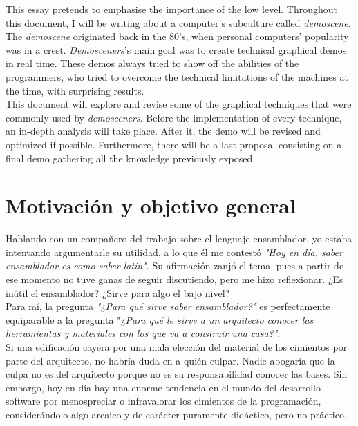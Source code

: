 This essay pretends to emphasise the importance of the low level. Throughout this document, I will be writing about a computer's subculture called \emph{demoscene}.\\

The \emph{demoscene} originated back in the 80's, when personal computers' popularity was in a crest. \emph{Demosceners}'s main goal was to create technical graphical demos in real time. These demos always tried to show off the abilities of the programmers, who tried to overcome the technical limitations of the machines at the time, with surprising results.\\

This document will explore and revise some of the graphical techniques that were commonly used by \emph{demosceners}. Before the implementation of every technique, an in-depth analysis will take place. After it, the demo will be revised and optimized if possible. Furthermore, there will be a last proposal consisting on a final demo gathering all the knowledge previously exposed.

\chapter*{Motivación y objetivo general}

\thispagestyle{empty}
\vspace{1cm}

Hablando con un compañero del trabajo sobre el lenguaje ensamblador,
yo estaba intentando argumentarle su utilidad, a lo que él me contestó 
\emph{"Hoy en día, saber ensamblador es como saber latín"}.
Su afirmación zanjó el tema, pues a partir de ese momento no tuve ganas de
seguir discutiendo, pero me hizo reflexionar. ¿Es inútil el ensamblador?
¿Sirve para algo el bajo nivel?\\

Para mí, la pregunta \emph{"¿Para qué sirve saber ensamblador?"} es perfectamente equiparable a la pregunta "\emph{¿Para qué le sirve a un arquitecto conocer las herramientas y materiales con los que va a construir una casa?"}.\\

Si una edificación cayera por una mala elección del material de los cimientos por parte del arquitecto, no habría duda en a quién culpar. Nadie abogaría que la culpa no es del arquitecto porque no es su responsabilidad conocer las bases.
Sin embargo, hoy en día hay una enorme tendencia en el mundo del desarrollo software por menospreciar o infravalorar los cimientos de la programación, considerándolo algo arcaico y de carácter puramente didáctico, pero no
práctico.\\ 

